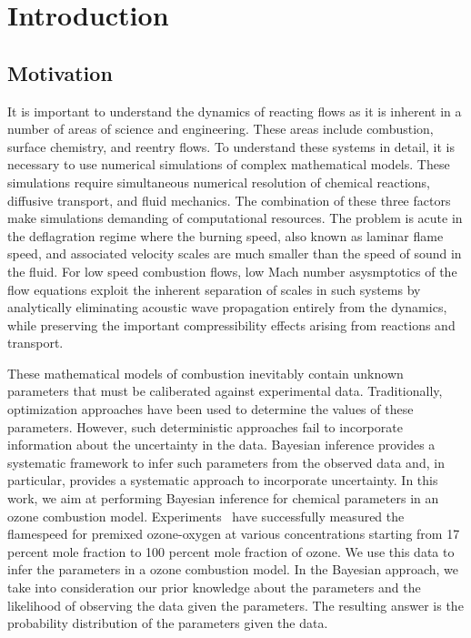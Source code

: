 
\chapter{Introduction}

\section{Motivation}
It is important to understand the dynamics of reacting flows as it is
inherent in a number of areas of science and engineering. These areas include
combustion, surface chemistry, and reentry flows. To understand these
systems in detail, it is necessary to use numerical simulations of
complex mathematical models. These
simulations require simultaneous numerical resolution of chemical
reactions, diffusive transport, and fluid mechanics. The combination
of these three factors make simulations demanding of computational
resources. The problem is acute in the deflagration regime where the
burning speed, also known as laminar flame speed, and associated
velocity scales are much smaller than the speed of sound in the fluid.
%
For low speed combustion flows, low Mach number asysmptotics
of the flow equations exploit the inherent separation of scales in
such systems by analytically eliminating acoustic wave propagation
entirely from the dynamics, while preserving the important
compressibility effects arising from reactions and transport.

\bigskip


These mathematical models of combustion inevitably contain unknown
parameters that must be caliberated against experimental
data. Traditionally, optimization approaches have been used to
determine the values of these parameters. However,
such deterministic approaches fail to incorporate information about
the uncertainty in the data. Bayesian inference provides a systematic
framework to infer such parameters from the observed data and, in
particular, provides a systematic approach to incorporate uncertainty.
In this work, we aim at performing Bayesian inference for chemical
parameters in an ozone combustion model. Experiments~\cite{Streng} have
successfully measured the flamespeed for premixed ozone-oxygen at
various concentrations starting from 17 percent mole fraction to 100 percent
mole fraction of ozone. We use this data to infer the
parameters in a ozone combustion model. In the Bayesian approach, we take
into consideration our prior knowledge about the parameters and the
likelihood of observing the data given the parameters. The resulting
answer is the probability distribution of the parameters given the
data.


